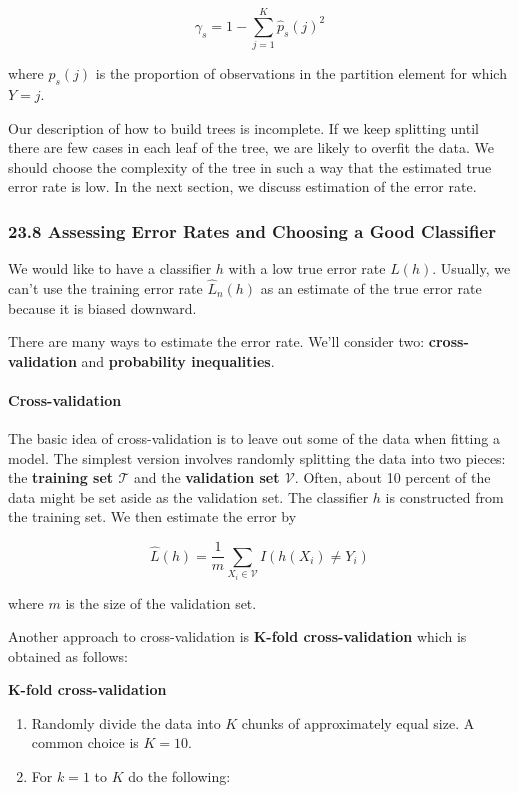 \[ \gamma_s = 1 - \sum_{j=1}^K \hat{p}_s(j)^2 \]

where \(\hat{p}_s(j)\) is the proportion of observations in the
partition element for which \(Y = j\).

Our description of how to build trees is incomplete. If we keep
splitting until there are few cases in each leaf of the tree, we are
likely to overfit the data. We should choose the complexity of the tree
in such a way that the estimated true error rate is low. In the next
section, we discuss estimation of the error rate.

\subsubsection{23.8 Assessing Error Rates and Choosing a Good Classifier}\label{assessing-error-rates-and-choosing-a-good-classifier}

We would like to have a classifier \(h\) with a low true error rate
\(L(h)\). Usually, we can't use the training error rate \(\hat{L}_n(h)\)
as an estimate of the true error rate because it is biased downward.

There are many ways to estimate the error rate. We'll consider two:
\textbf{cross-validation} and \textbf{probability inequalities}.

\paragraph{Cross-validation}\label{cross-validation}

The basic idea of cross-validation is to leave out some of the data when
fitting a model. The simplest version involves randomly splitting the
data into two pieces: the \textbf{training set \(\mathcal{T}\)} and the
\textbf{validation set \(\mathcal{V}\)}. Often, about 10 percent of the
data might be set aside as the validation set. The classifier \(h\) is
constructed from the training set. We then estimate the error by

\[ \hat{L}(h) = \frac{1}{m} \sum_{X_i \in \mathcal{V}} I(h(X_i) \neq Y_i) \]

where \(m\) is the size of the validation set.

Another approach to cross-validation is \textbf{K-fold cross-validation}
which is obtained as follows:

\textbf{K-fold cross-validation}

\begin{enumerate}
\def\labelenumi{\arabic{enumi}.}
\item
  Randomly divide the data into \(K\) chunks of approximately equal
  size. A common choice is \(K = 10\).
\item
  For \(k = 1\) to \(K\) do the following:
\end{enumerate}

